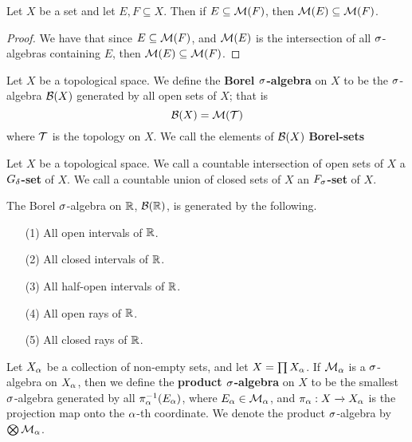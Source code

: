 \begin{lemma}\label{lemma_1.1.4}
    Let $X$ be a set and let $E,F \subseteq X$. Then if $E \subseteq \mathcal{M}(F)$,
    then $\mathcal{M}(E) \subseteq \mathcal{M}(F)$.
\end{lemma}
\begin{proof}
    We have that since $E \subseteq \mathcal{M}(F)$, and $\mathcal{M}(E)$ is the intersection of
    all $\sigma$-algebras containing  $E$, then  $\mathcal{M}(E) \subseteq \mathcal{M}(F)$.
\end{proof}

\begin{definition}
    Let $X$ be a topological space. We define the  \textbf{Borel $\sigma$-algebra}
    on $X$ to be the  $\sigma$-algebra  $\mathcal{B}(X)$ generated by all open sets of $X$;
    that is
    \begin{equation*}
        \mathcal{B}(X)=\mathcal{M}(\mathcal{T})
    \end{equation*}
    where $\mathcal{T}$ is the topology on $X$. We call the elements of $\mathcal{B}(X)$
    \textbf{Borel-sets}
\end{definition}

\begin{definition}
    Let $X$ be a topological space. We call a countable intersection of open
    sets of  $X$ a \textbf{$G_\delta$-set} of $X$. We call a countable union of
    closed sets of $X$ an  \textbf{$F_\sigma$-set} of $X$.
\end{definition}

\begin{theorem}\label{lemma_1.1.5}
    The Borel $\sigma$-algebra on $\mathbb{R}$,  $\mathcal{B}(\mathbb{R})$, is generated by the following.
    \begin{enumerate}
        \item[(1)] All open intervals of $\mathbb{R}$.

        \item[(2)] All closed intervals of $\mathbb{R}$.

        \item[(3)] All half-open intervals of $\mathbb{R}$.

        \item[(4)] All open rays of $\mathbb{R}$.

        \item[(5)] All closed rays of $\mathbb{R}$.
    \end{enumerate}
\end{theorem}

\begin{definition}
    Let $X_\alpha$ be a collection of non-empty sets, and let  $X=\prod{X_\alpha}$. If
    $\mathcal{M}_\alpha$ is a $\sigma$-algebra on $X_\alpha$, then we define the \textbf{product
    $\sigma$-algebra} on $X$ to be the smallest $\sigma$-algebra generated by all
    $\pi_\alpha^{-1}(E_\alpha)$, where $E_\alpha \in \mathcal{M}_\alpha$, and $\pi_\alpha:X \xrightarrow{}
    X_\alpha$ is the projection map onto the $\alpha$-th coordinate. We denote the
    product  $\sigma$-algebra by $\bigotimes{\mathcal{M}_\alpha}$.
\end{definition}


